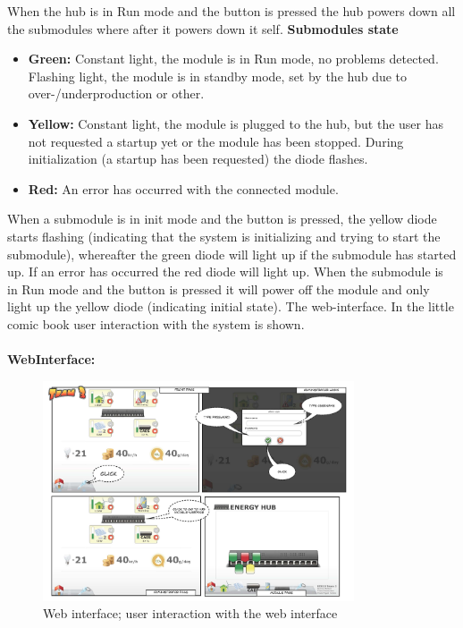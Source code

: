 		When the hub is in Run mode and the button is pressed the hub powers down all the submodules where after it powers down it self.
		\textbf{Submodules state}
		\begin{itemize}
			\item \textbf{Green: }Constant light, the module is in Run mode, no problems detected. Flashing light, the module is in standby mode, set by the hub
							due to over-/underproduction or other.
			\item \textbf{Yellow: }Constant light, the module is plugged to the hub, but the user has not requested a startup yet or the module has been stopped.
							During initialization (a startup has been requested) the diode flashes.
			\item \textbf{Red: }An error has occurred with the connected module.
		\end{itemize}
		When a submodule is in init mode and the button is pressed, the yellow diode starts flashing (indicating that the system is initializing and trying to start the submodule), whereafter
		the green diode will light up if the submodule has started up. If an error has occurred the red diode will light up. 
		When the submodule is in Run mode and the button is pressed it will power off the module and only light up the yellow diode (indicating initial state).
		The web-interface. In the little comic book user interaction with the system is shown.
		\\ \\\textbf{WebInterface: }
		\begin{figure}[H]
			\begin{centering}
				 \includegraphics[width=0.82\textwidth]{images/web_interface1.jpg}
				\caption{Web interface; user interaction with the web interface}
		 	\end{centering}
		\end{figure}

